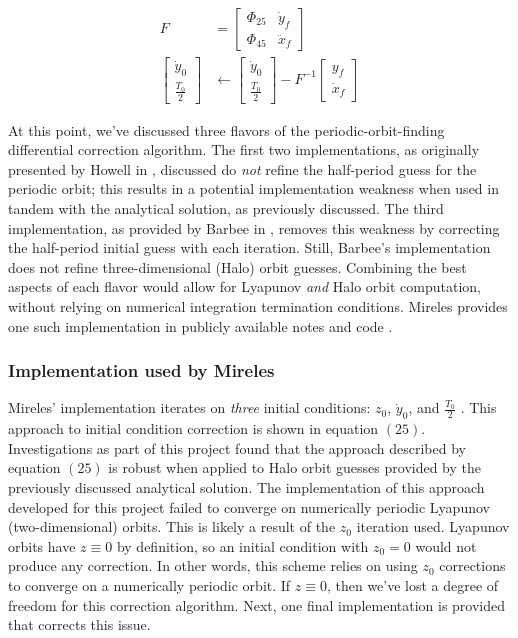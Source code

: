 \documentclass[conf]{new-aiaa}
\begin{document}
\begin{multicols}{2}
\begin{equation}
    \begin{aligned}
        F &= \begin{bmatrix} \Phi_{25} & \dot{y}_f \\ \Phi_{45} & \ddot{x}_f \end{bmatrix} \\
        \begin{bmatrix} \dot{y}_0 \\ \frac{T_0}{2} \end{bmatrix} & \leftarrow 
        \begin{bmatrix} \dot{y}_0 \\ \frac{T_0}{2} \end{bmatrix} - F^{-1} \begin{bmatrix} y_f \\ \dot{x}_f \end{bmatrix}
    \end{aligned}
\end{equation}

At this point, we've discussed three flavors of the periodic-orbit-finding 
differential correction algorithm. The first two implementations, 
as originally presented by Howell in \cite{howell1984three}, discussed 
do \textit{not} refine the half-period guess for the periodic orbit; this 
results in a potential implementation weakness when used in tandem with 
the analytical solution, as previously discussed. The third implementation,
as provided by Barbee in \cite{barbeeCode}, removes this weakness by 
correcting the half-period initial guess with each iteration. Still, Barbee's
implementation does not refine three-dimensional (Halo) orbit guesses.
Combining the best aspects of each flavor would allow for Lyapunov \textit{and}
Halo orbit computation, without relying on numerical integration
termination conditions. Mireles provides one such implementation in 
publicly available notes and code \cite{mirelesNotes} \cite{mirelesCode}.

\subsubsection*{Implementation used by Mireles}
Mireles' implementation iterates on \textit{three} initial conditions:
$z_0$, $\dot{y}_0$, and $\frac{T_0}{2}$ \cite{mirelesNotes} \cite{mirelesCode}.
This approach to initial condition correction is shown in equation $(25)$.
Investigations as part of this project found that the approach described by 
equation $(25)$ is robust when applied to Halo orbit guesses provided 
by the previously discussed analytical solution. The implementation of this 
approach developed for this project failed to converge on numerically 
periodic Lyapunov (two-dimensional) orbits. This is likely a result 
of the $z_0$ iteration used. Lyapunov orbits have $z \equiv 0$ by definition, 
so an initial condition with $z_0 = 0$ would not produce any correction.
In other words, this scheme relies on using $z_0$ corrections to 
converge on a numerically periodic orbit. If $z \equiv 0$, then we've lost 
a degree of freedom for this correction algorithm. Next, one final 
implementation is provided that corrects this issue.


\end{multicols}
\end{document}

